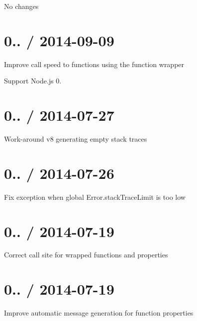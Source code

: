 \begin{DoxyItemize}
\item No changes
\end{DoxyItemize}

\section*{0.. / 2014-\/09-\/09 }


\begin{DoxyItemize}
\item Improve call speed to functions using the function wrapper
\item Support Node.\+js 0.
\end{DoxyItemize}

\section*{0.. / 2014-\/07-\/27 }


\begin{DoxyItemize}
\item Work-\/around v8 generating empty stack traces
\end{DoxyItemize}

\section*{0.. / 2014-\/07-\/26 }


\begin{DoxyItemize}
\item Fix exception when global {\ttfamily Error.\+stack\+Trace\+Limit} is too low
\end{DoxyItemize}

\section*{0.. / 2014-\/07-\/19 }


\begin{DoxyItemize}
\item Correct call site for wrapped functions and properties
\end{DoxyItemize}

\section*{0.. / 2014-\/07-\/19 }


\begin{DoxyItemize}
\item Improve automatic message generation for function properties
\end{DoxyItemize}

